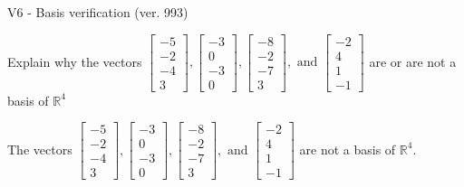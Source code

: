 \begin{exercise}
  \begin{exerciseTitle}V6 - Basis verification (ver. 993)\end{exerciseTitle}
  \begin{exerciseStatement}
    Explain why the vectors \(\left[\begin{array}{r}
-5 \\
-2 \\
-4 \\
3
\end{array}\right] , \left[\begin{array}{r}
-3 \\
0 \\
-3 \\
0
\end{array}\right] , \left[\begin{array}{r}
-8 \\
-2 \\
-7 \\
3
\end{array}\right] , \text{ and } \left[\begin{array}{r}
-2 \\
4 \\
1 \\
-1
\end{array}\right]\) are or are not a basis of \(\mathbb{R}^4\)	


  \end{exerciseStatement}
  \begin{exerciseAnswer}
   The vectors \(\left[\begin{array}{r}
-5 \\
-2 \\
-4 \\
3
\end{array}\right] , \left[\begin{array}{r}
-3 \\
0 \\
-3 \\
0
\end{array}\right] , \left[\begin{array}{r}
-8 \\
-2 \\
-7 \\
3
\end{array}\right] , \text{ and } \left[\begin{array}{r}
-2 \\
4 \\
1 \\
-1
\end{array}\right]\) 
  	 are not  a basis of \(\mathbb{R}^4\).
  


  \end{exerciseAnswer}
\end{exercise}